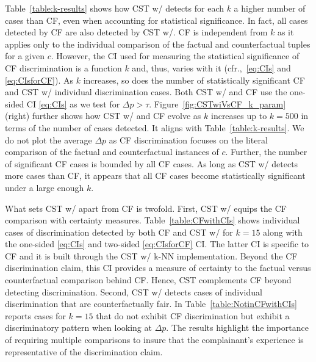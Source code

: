 
Table~\ref{table:k-results} shows how CST w/ detects for each $k$ a higher number of cases than CF, even when accounting for statistical significance.
In fact, all cases detected by CF are also detected by CST w/.
CF is independent from $k$ as it applies only to the individual comparison of the factual and counterfactual tuples for a given $c$.
However, the CI used for measuring the statistical significance of CF discrimination is a function $k$ and, thus, varies with it (cfr.,~\eqref{eq:CIs} and \eqref{eq:CIsforCF}).
As $k$ increases, so does the number of statistically significant CF and CST w/ individual discrimination cases.
Both CST w/ and CF use the one-sided CI \eqref{eq:CIs} as we test for $\Delta p > \tau$.
%
Figure~\ref{fig:CSTwiVsCF_k_param} (right) further shows how CST w/ and CF evolve as $k$ increases up to $k=500$ in terms of the number of cases detected.
It aligns with Table~\ref{table:k-results}. 
We do not plot the average $\Delta p$ as CF discrimination focuses on the literal comparison of the factual and counterfactual instances of $c$.
Further, the number of significant CF cases is bounded by all CF cases. 
As long as CST w/ detects more cases than CF, it appears that all CF cases become statistically significant under a large enough $k$. 

What sets CST w/ apart from CF is twofold.
%
First, CST w/ equips the CF comparison with certainty measures.
Table~\ref{table:CFwithCIs} shows individual cases of discrimination detected by both CF and CST w/ for $k=15$ along with the one-sided \eqref{eq:CIs} and two-sided \eqref{eq:CIsforCF} CI.
The latter CI is specific to CF and it is built through the CST w/ k-NN implementation. 
Beyond the CF discrimination claim, this CI provides a measure of certainty to the factual versus counterfactual comparison behind CF.
Hence, CST complements CF beyond detecting discrimination.
%
Second, CST w/ detects cases of individual discrimination that are counterfactually fair. 
In Table~\ref{table:NotinCFwithCIs} reports cases for $k=15$ that do not exhibit CF discrimination but exhibit a discriminatory pattern when looking at $\Delta p$.
The results highlight the importance of requiring multiple comparisons to insure that the complainant's experience is representative of the discrimination claim.

